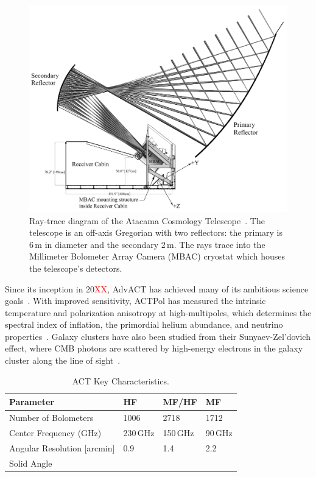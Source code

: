 \begin{figure}[t]
    \centering
    \includegraphics[width = \textwidth]{Figures/act_inst.pdf}
    \caption{Ray-trace diagram of the Atacama Cosmology Telescope~\cite{act_inst}.  The telescope is an off-axis Gregorian with two reflectors: the primary is 6\,m in diameter and the secondary 2\,m.  The rays trace into the Millimeter Bolometer Array Camera (MBAC) cryostat which houses the telescope's detectors.}
    \label{fig:act_inst}
\end{figure}

Since its inception in 20\textcolor{red}{XX}, AdvACT has achieved many of its ambitious science goals~\cite{2016JLTP184772H}.  With improved sensitivity, ACTPol has measured the intrinsic temperature and polarization anisotropy at high-multipoles, which determines the spectral index of inflation, the primordial helium abundance, and neutrino properties~\cite{10.1117/12.857464}.  Galaxy clusters have also been studied from their Sunyaev-Zel’dovich effect, where CMB photons are scattered by high-energy electrons in the galaxy cluster along the line of sight~\cite{weinberg_cosmo}.

\begin{table}[hb]
    \centering
    \begin{tabular}{|l|l|l|l|} \hline
        \textbf{ Parameter} &  \textbf{HF} &  \textbf{MF/HF}  &  \textbf{MF}  \\ \hline \hline
        Number of Bolometers & 1006 & 2718 & 1712\\\hline
        Center Frequency (GHz) & 230\,GHz & 150\,GHz & 90\,GHz\\\hline
        Angular Resolution [arcmin] &  0.9 &1.4 & 2.2\\\hline
        Solid Angle & & &\\\hline
    \end{tabular} \caption{ACT Key Characteristics.}
    \label{tab:act}
\end{table}
